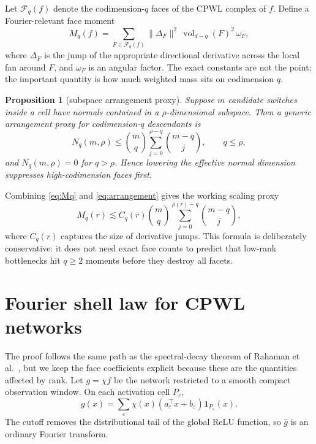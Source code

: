 \documentclass[10pt,twocolumn]{article}
\newtheorem{proposition}{Proposition}
\newcommand{\1}{\mathbf{1}}
\newcommand{\cF}{\mathcal{F}}
\newcommand{\wh}{\widehat}
\begin{document}
Let $\cF_q(f)$ denote the codimension-$q$ faces of the CPWL complex of $f$.  Define a Fourier-relevant face moment
\begin{equation}\label{eq:Mq}
M_q(f)=\sum_{F\in\cF_q(f)} \|\Delta_F\|^2\,\operatorname{vol}_{d-q}(F)^2\,\omega_F,
\end{equation}
where $\Delta_F$ is the jump of the appropriate directional derivative across the local fan around $F$, and $\omega_F$ is an angular factor.  The exact constants are not the point; the important quantity is how much weighted mass sits on codimension $q$.

\begin{proposition}[subspace arrangement proxy]
Suppose $m$ candidate switches inside a cell have normals contained in a $\rho$-dimensional subspace.  Then a generic arrangement proxy for codimension-$q$ descendants is
\begin{equation}\label{eq:arrangement}
N_q(m,\rho)\le \binom{m}{q}\sum_{j=0}^{\rho-q}\binom{m-q}{j},\qquad q\le \rho,
\end{equation}
and $N_q(m,\rho)=0$ for $q>\rho$.  Hence lowering the effective normal dimension suppresses high-codimension faces first.
\end{proposition}

Combining \eqref{eq:Mq} and \eqref{eq:arrangement} gives the working scaling proxy
\begin{equation}\label{eq:Mqproxy}
M_q(r)\lesssim C_q(r)\binom{m}{q}\sum_{j=0}^{\rho(r)-q}\binom{m-q}{j},
\end{equation}
where $C_q(r)$ captures the size of derivative jumps.  This formula is deliberately conservative: it does not need exact face counts to predict that low-rank bottlenecks hit $q\ge2$ moments before they destroy all facets.

\section{Fourier shell law for CPWL networks}
The proof follows the same path as the spectral-decay theorem of Rahaman et al.~\cite{rahaman2019spectral}, but we keep the face coefficients explicit because these are the quantities affected by rank.  Let $g=\chi f$ be the network restricted to a smooth compact observation window.  On each activation cell $P_\varepsilon$,
\begin{equation}
g(x)=\sum_\varepsilon \chi(x)(a_\varepsilon^\top x+b_\varepsilon)\mathbf 1_{P_\varepsilon}(x).
\end{equation}
The cutoff removes the distributional tail of the global ReLU function, so $\wh g$ is an ordinary Fourier transform.
\end{document}
